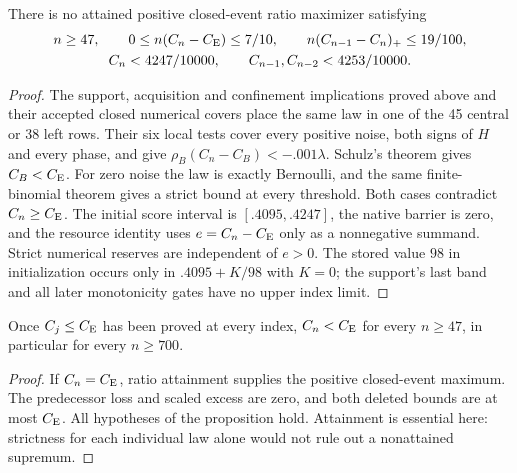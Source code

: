 \begin{proposition}\label{j:local:uniform}
There is no attained positive closed-event ratio maximizer satisfying
\begin{gather*}
 n\ge47,\qquad 0\le n(C_n-C_{\mathrm E})\le7/10,\qquad
 n(C_{n-1}-C_n)_+\le19/100,\\
 C_n<4247/10000,\qquad C_{n-1},C_{n-2}<4253/10000.
\end{gather*}
\end{proposition}
\begin{proof}
The support, acquisition and confinement implications proved above and
their accepted closed numerical covers place the same law in one of the
45 central or 38 left rows. Their six local tests cover every positive
noise, both signs of $H$ and every phase, and give
$\rho_B(C_n-C_B)<-.001\lambda$. Schulz's theorem gives $C_B<C_{\mathrm E}$.
For zero noise the law is exactly Bernoulli, and the same finite-binomial
theorem gives a strict bound at every threshold. Both cases contradict
$C_n\ge C_{\mathrm E}$.
The initial score interval is $[.4095,.4247]$, the native barrier is zero,
and the resource identity uses $e=C_n-C_{\mathrm E}$ only as a nonnegative summand.
Strict numerical reserves are independent of $e>0$. The stored value $98$
in initialization occurs only in $.4095+K/98$ with $K=0$; the support's
last band and all later monotonicity gates have no upper index limit.
\end{proof}
\begin{corollary}\label{j:local:equality}
Once $C_j\le C_{\mathrm E}$ has been proved at every index, $C_n<C_{\mathrm E}$ for every
$n\ge47$, in particular for every $n\ge700$.
\end{corollary}
\begin{proof}
If $C_n=C_{\mathrm E}$, ratio attainment supplies the positive closed-event maximum.
The predecessor loss and scaled excess are zero, and both deleted bounds
are at most $C_{\mathrm E}$. All hypotheses of the proposition hold. Attainment is
essential here: strictness for each individual law alone would not rule
out a nonattained supremum.
\end{proof}
